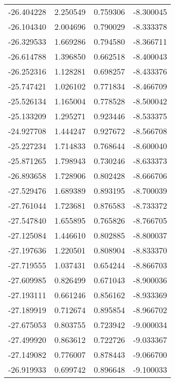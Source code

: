 \begin{tabular}{rrrr}
      -26.404228 &         2.250549 &    0.759306 &  -8.300045 \\
      -26.104340 &         2.004696 &    0.790029 &  -8.333378 \\
      -26.329533 &         1.669286 &    0.794580 &  -8.366711 \\
      -26.614788 &         1.396850 &    0.662518 &  -8.400043 \\
      -26.252316 &         1.128281 &    0.698257 &  -8.433376 \\
      -25.747421 &         1.026102 &    0.771834 &  -8.466709 \\
      -25.526134 &         1.165004 &    0.778528 &  -8.500042 \\
      -25.133209 &         1.295271 &    0.923446 &  -8.533375 \\
      -24.927708 &         1.444247 &    0.927672 &  -8.566708 \\
      -25.227234 &         1.714833 &    0.768644 &  -8.600040 \\
      -25.871265 &         1.798943 &    0.730246 &  -8.633373 \\
      -26.893658 &         1.728906 &    0.802428 &  -8.666706 \\
      -27.529476 &         1.689389 &    0.893195 &  -8.700039 \\
      -27.761044 &         1.723681 &    0.876583 &  -8.733372 \\
      -27.547840 &         1.655895 &    0.765826 &  -8.766705 \\
      -27.125084 &         1.446610 &    0.802885 &  -8.800037 \\
      -27.197636 &         1.220501 &    0.808904 &  -8.833370 \\
      -27.719555 &         1.037431 &    0.654244 &  -8.866703 \\
      -27.609985 &         0.826499 &    0.671043 &  -8.900036 \\
      -27.193111 &         0.661246 &    0.856162 &  -8.933369 \\
      -27.189919 &         0.712674 &    0.895854 &  -8.966702 \\
      -27.675053 &         0.803755 &    0.723942 &  -9.000034 \\
      -27.499920 &         0.863612 &    0.722726 &  -9.033367 \\
      -27.149082 &         0.776007 &    0.878443 &  -9.066700 \\
      -26.919933 &         0.699742 &    0.896648 &  -9.100033 \\

\end{tabular}
